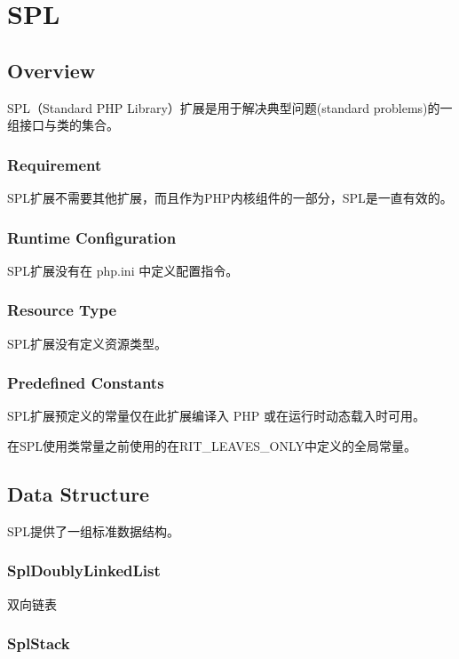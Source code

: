 \part{SPL}

\chapter{Overview}

SPL（Standard PHP Library）扩展是用于解决典型问题(standard problems)的一组接口与类的集合。

\section{Requirement}

SPL扩展不需要其他扩展，而且作为PHP内核组件的一部分，SPL是一直有效的。

\section{Runtime Configuration}

SPL扩展没有在 php.ini 中定义配置指令。

\section{Resource Type}

SPL扩展没有定义资源类型。

\section{Predefined Constants}

SPL扩展预定义的常量仅在此扩展编译入 PHP 或在运行时动态载入时可用。

在SPL使用类常量之前使用的在RIT\_LEAVES\_ONLY中定义的全局常量。

\chapter{Data Structure}

SPL提供了一组标准数据结构。


\section{SplDoublyLinkedList}

双向链表

\section{SplStack}



